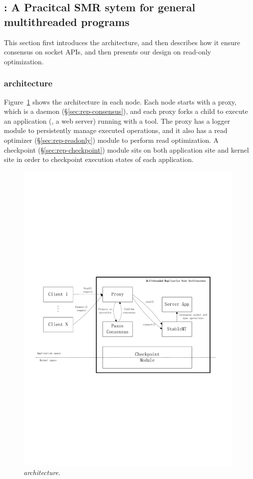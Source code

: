 \subsection{\msmr: A Pracitcal SMR sytem for general multithreaded programs} \label{sec:rep-msmr}
This section first introduces the \msmr architecture, and then describes how it 
ensure consensus on socket APIs, and then presents our design on read-only 
optimization.

\subsubsection{\msmr architecture} \label{sec:rep-arch}

Figure~\ref{fig:arch} shows the \msmr architecture in each node. Each node starts with a proxy, 
which is a \paxos daemon (\S\ref{sec:rep-consensus}), and each proxy forks a child to execute an 
application (\eg, a web server) running with a \smt tool. The proxy has a logger module to 
persistently manage executed operations, and it also has a read optimizer (\S\ref{sec:rep-readonly})
module to perform read optimization. A checkpoint (\S\ref{sec:rep-checkpoint}) module sits on both 
application site and kernel site in order to checkpoint execution states of each application.

\begin{figure}[t]
\centering
\includegraphics[width=0.8\columnwidth]{figures/architecture}
\vspace{-.05in}
\caption{{\em \msmr architecture.}} \label{fig:arch}
\vspace{-.05in}
\end{figure}



